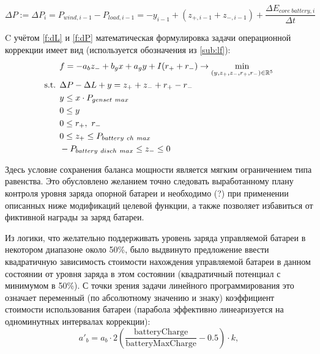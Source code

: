 \documentclass{report}
\def \R {\mathbb{R}}
\begin{document}
        \begin{equation}
        \label{f:dP}
        \Delta P := \Delta P_i =  
        P_{wind, i-1} - P_{load, i-1} 
        = -y_{i-1}  + (z_{+, i-1} + z_{-, i-1})
        + \frac{\Delta E_{core~battery, i}}{\Delta t} 
        \end{equation}
        
        C учётом \ref{f:dL} и \ref{f:dP} математическая формулировка задачи операционной коррекции имеет вид (используется обозначения из \ref{sub:lf}):
 \begin{equation}\label{f:lf}
\begin{split}
\vspace{-4mm}
&f =  -a_b z_- + b_g x + a_g y + I(r_+ + r_-)
\rightarrow \min\limits_{(y, z_+, z_-, r_+, r_-) \in \R^5 }\\
\text{s.t. }& \Delta P - \Delta L + y = z_+ + z_- + r_+ - r_- \\
&y \leq x \cdot P_{genset~max}\\
&0 \leq y \\
&0 \leq r_+,~r_- \\
&0 \leq z_+ \leq P_{battery~ch~max} \\
&-P_{battery~disch~max} \leq z_- \leq 0 \\
\end{split}
\end{equation} 

Здесь условие сохранения баланса мощности является мягким ограничением типа равенства.
Это обусловлено желанием точно следовать выработанному плану контроля уровня заряда опорной батареи и необходимо (?) при применении описанных ниже модификаций целевой функции, а также позволяет избавиться от фиктивной награды за заряд батареи.

Из логики, что желательно поддерживать уровень заряда управляемой батареи в некотором диапазоне около 50\%, было выдвинуто предложение
ввести квадратичную зависимость стоимости нахождения управляемой батареи в данном состоянии от уровня заряда в этом состоянии (квадратичный потенциал с минимумом в 50\%).
С точки зрения задачи линейного программирования это означает переменный (по абсолютному значению и знаку) коэффициент стоимости использования батареи (парабола эффективно линеаризуется на одноминутных интервалах коррекции):
\begin{equation}
    a'_b = a_b \cdot 2 \left(\frac{\text{batteryCharge}}{\text{batteryMaxCharge}} - 0.5\right) \cdot k,
\end{equation}
\end{document}
